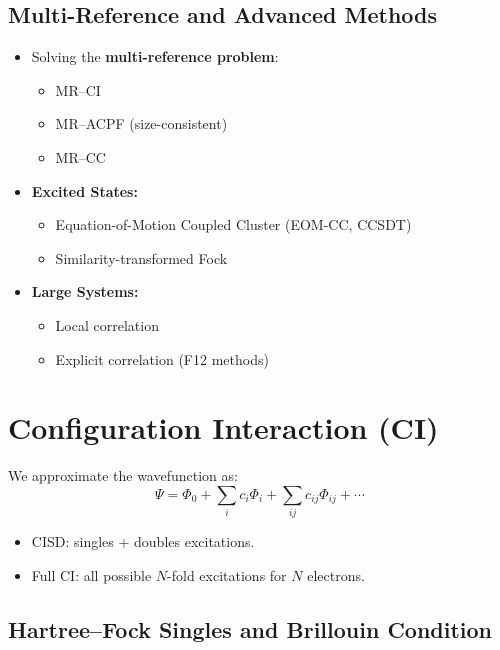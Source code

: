 \documentclass[12pt]{article}
\begin{document}
\subsection{Multi-Reference and Advanced Methods}

\begin{itemize}
    \item Solving the \textbf{multi-reference problem}:
    \begin{itemize}
        \item MR--CI
        \item MR--ACPF (size-consistent)
        \item MR--CC
    \end{itemize}

    \item \textbf{Excited States:}
    \begin{itemize}
        \item Equation-of-Motion Coupled Cluster (EOM-CC, CCSDT)
        \item Similarity-transformed Fock
    \end{itemize}

    \item \textbf{Large Systems:}
    \begin{itemize}
        \item Local correlation
        \item Explicit correlation (F12 methods)
    \end{itemize}
\end{itemize}

\section{Configuration Interaction (CI)}

We approximate the wavefunction as:
\[
\Psi = \Phi_0 + \sum_i c_i \Phi_i + \sum_{ij} c_{ij} \Phi_{ij} + \cdots
\]

\begin{itemize}
    \item CISD: singles + doubles excitations.
    \item Full CI: all possible \(N\)-fold excitations for \(N\) electrons.
\end{itemize}

\subsection{Hartree--Fock Singles and Brillouin Condition}
\end{document}
